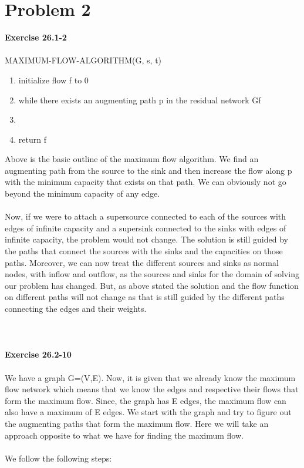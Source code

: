 \documentclass[10pt]{article}
\newcommand{\tab}[1]{\hspace{.05\textwidth}\rlap{#1}}
\begin{document}
\section*{Problem 2}
\textbf{Exercise 26.1-2}\\\\
MAXIMUM-FLOW-ALGORITHM(G, s, t)
\begin{enumerate}
\item  initialize flow f to 0
\item while there exists an augmenting path p in the residual network Gf
\item \tab{augment flow f along p}
\item  return f
\end{enumerate}
Above is the basic outline of the maximum flow algorithm. We find an augmenting path from the source to the sink and then increase the flow along p with the minimum capacity that exists on that path. We can obviously not go beyond the minimum capacity of any edge.\\\\
Now, if we were to attach a supersource connected to each of the sources with edges of infinite capacity and a supersink connected to the sinks with edges of infinite capacity, the problem would not change. The solution is still guided by the paths that connect the sources with the sinks and the capacities on those paths. Moreover, we can now treat the different sources and sinks as normal nodes, with inflow and outflow, as the sources and sinks for the domain of solving our problem has changed. But, as above stated the solution and the flow function on different paths will not change as that is still guided by the different paths connecting the edges and their weights.\\\\\\\\
\textbf{Exercise 26.2-10}\\\\
We have a graph G=(V,E). Now, it is given that we already know the maximum flow network which means that we know the edges and respective their flows that form the maximum flow. Since, the graph has E edges, the maximum flow can also have a maximum of E edges. We start with the graph and try to figure out the augmenting paths that form the maximum flow. Here we will take an approach opposite to what we have for finding the maximum flow.\\\\
We follow the following steps:\\\\
\end{document}
